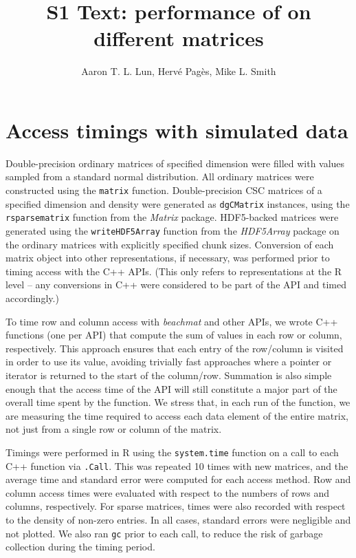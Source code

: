 \documentclass{article}
\title{S1 Text: performance of \beachmat{} on different matrices}
\author{Aaron T. L. Lun, Herv\'e Pag\`es, Mike L. Smith}
\newcommand{\beachmat}{\textit{beachmat}}
\newcommand{\code}[1]{\texttt{#1}}
\begin{document}
\maketitle

\section{Access timings with simulated data}
Double-precision ordinary matrices of specified dimension were filled with values sampled from a standard normal distribution.
All ordinary matrices were constructed using the \code{matrix} function.
Double-precision CSC matrices of a specified dimension and density were generated as \code{dgCMatrix} instances, using the \code{rsparsematrix} function from the \textit{Matrix} package.
HDF5-backed matrices were generated using the \code{writeHDF5Array} function from the \textit{HDF5Array} package on the ordinary matrices with explicitly specified chunk sizes.
Conversion of each matrix object into other representations, if necessary, was performed prior to timing access with the C++ APIs.
(This only refers to representations at the R level -- any conversions in C++ were considered to be part of the API and timed accordingly.)

To time row and column access with \beachmat{} and other APIs, we wrote C++ functions (one per API) that compute the sum of values in each row or column, respectively.
This approach ensures that each entry of the row/column is visited in order to use its value, avoiding trivially fast approaches where a pointer or iterator is returned to the start of the column/row.
Summation is also simple enough that the access time of the API will still constitute a major part of the overall time spent by the function.
We stress that, in each run of the function, we are measuring the time required to access each data element of the entire matrix, not just from a single row or column of the matrix.

Timings were performed in R using the \code{system.time} function on a call to each C++ function via \code{.Call}. 
This was repeated 10 times with new matrices, and the average time and standard error were computed for each access method. 
Row and column access times were evaluated with respect to the numbers of rows and columns, respectively.
For sparse matrices, times were also recorded with respect to the density of non-zero entries.
In all cases, standard errors were negligible and not plotted.
We also ran \code{gc} prior to each call, to reduce the risk of garbage collection during the timing period.
\end{document}
